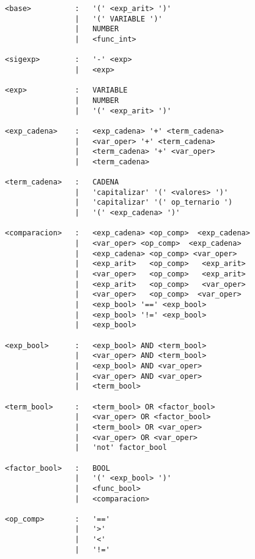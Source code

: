 \begin{verbatim}
<base>          :   '(' <exp_arit> ')'
                |   '(' VARIABLE ')'
                |   NUMBER
                |   <func_int>

<sigexp>        :   '-' <exp>
                |   <exp>

<exp>           :   VARIABLE
                |   NUMBER
                |   '(' <exp_arit> ')'

<exp_cadena>    :   <exp_cadena> '+' <term_cadena>
                |   <var_oper> '+' <term_cadena>
                |   <term_cadena> '+' <var_oper> 
                |   <term_cadena> 

<term_cadena>   :   CADENA
                |   'capitalizar' '(' <valores> ')'
                |   'capitalizar' '(' op_ternario ')
                |   '(' <exp_cadena> ')'

<comparacion>   :   <exp_cadena> <op_comp>  <exp_cadena>
                |   <var_oper> <op_comp>  <exp_cadena>
                |   <exp_cadena> <op_comp> <var_oper> 
                |   <exp_arit>   <op_comp>   <exp_arit>
                |   <var_oper>   <op_comp>   <exp_arit>
                |   <exp_arit>   <op_comp>   <var_oper>
                |   <var_oper>   <op_comp>  <var_oper> 
                |   <exp_bool> '==' <exp_bool>
                |   <exp_bool> '!=' <exp_bool>
                |   <exp_bool>

<exp_bool>      :   <exp_bool> AND <term_bool>
                |   <var_oper> AND <term_bool>
                |   <exp_bool> AND <var_oper>
                |   <var_oper> AND <var_oper>
                |   <term_bool>

<term_bool>     :   <term_bool> OR <factor_bool>
                |   <var_oper> OR <factor_bool>
                |   <term_bool> OR <var_oper>
                |   <var_oper> OR <var_oper>
                |   'not' factor_bool

<factor_bool>   :   BOOL
                |   '(' <exp_bool> ')'
                |   <func_bool>
                |   <comparacion>

<op_comp>       :   '=='
                |   '>'
                |   '<'
                |   '!='


    
\end{verbatim}
